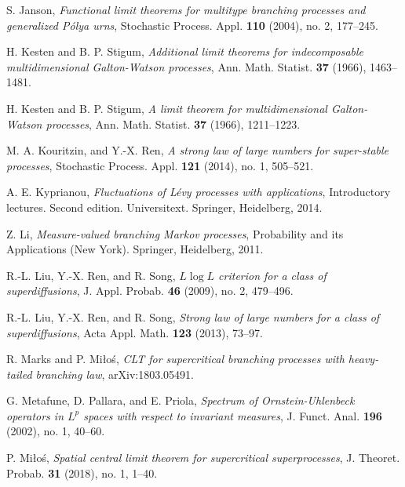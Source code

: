 \documentclass[EJP]{ejpecp} %
\begin{document}
\begin{thebibliography}{10}
  S. Janson,
  \emph{Functional limit theorems for multitype branching processes and generalized {P}\'{o}lya urns},
  Stochastic Process. Appl. \textbf{110} (2004), no. 2, 177--245.

  H. Kesten and B. P. Stigum,
  \emph{Additional limit theorems for indecomposable multidimensional {G}alton-{W}atson processes},
  Ann. Math. Statist. \textbf{37} (1966), 1463--1481.

  H. Kesten and B. P. Stigum,
  \emph{A limit theorem for multidimensional {G}alton-{W}atson processes},
  Ann. Math. Statist. \textbf{37} (1966), 1211--1223.

  M. A. Kouritzin, and Y.-X. Ren,
  \emph{A strong law of large numbers for super-stable processes},
  Stochastic Process. Appl. \textbf{121} (2014), no. 1, 505--521.

  A. E. Kyprianou,
  \emph{Fluctuations of {L}\'{e}vy processes with applications},
    Introductory lectures. Second edition. Universitext. Springer, Heidelberg, 2014.

  Z. Li,
  \emph{Measure-valued branching {M}arkov processes},
  Probability and its Applications (New York). Springer, Heidelberg, 2011.

  R.-L. Liu, Y.-X. Ren, and R. Song,
  \emph{{$L\log L$} criterion for a class of superdiffusions},
  J. Appl. Probab. \textbf{46} (2009), no. 2, 479--496.

  R.-L. Liu, Y.-X. Ren, and R. Song,
  \emph{Strong law of large numbers for a class of superdiffusions},
  Acta Appl. Math. \textbf{123} (2013), 73--97.

  R. Marks and P. Mi{\l}o{\'s},
  \emph{C{LT} for supercritical branching processes with heavy-tailed branching law},
  arXiv:1803.05491.

  G. Metafune, D. Pallara, and E. Priola,
  \emph{Spectrum of {O}rnstein-{U}hlenbeck operators in {$L^p$} spaces with respect to invariant  measures},
  J. Funct. Anal. \textbf{196} (2002), no. 1, 40--60.

  P. Mi{\l}o{\'s},
  \emph{Spatial central limit theorem for supercritical superprocesses},
  J. Theoret. Probab. \textbf{31} (2018), no. 1, 1--40.


\end{thebibliography}
\end{document}
